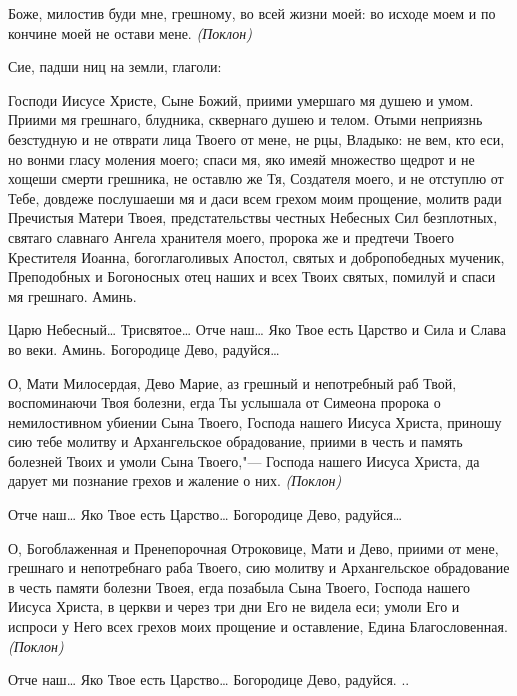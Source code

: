 \normalfont{}Боже, милостив буди мне, грешному, во всей жизни моей: во исходе моем и по кончине моей не остави мене. \itshape (Поклон)

Сие, падши ниц на земли, глаголи:

\normalfont{}Господи Иисусе Христе, Сыне Божий, приими умершаго мя душею и умом. Приими мя грешнаго, блудника, сквернаго душею и телом. Отыми неприязнь безстудную и не отврати лица Твоего от мене, не рцы, Владыко: не вем, кто еси, но вонми гласу моления моего; спаси мя, яко имеяй множество щедрот и не хощеши смерти грешника, не оставлю же Тя, Создателя моего, и не отступлю от Тебе, довдеже послушаеши мя и даси всем грехом моим прощение, молитв ради Пречистыя Матери Твоея, предстательствы честных Небесных Сил безплотных, святаго славнаго Ангела хранителя моего, пророка же и предтечи Твоего Крестителя Иоанна, богоглаголивых Апостол, святых и добропобедных мученик, Преподобных и Богоносных отец наших и всех Твоих святых, помилуй и спаси мя грешнаго. Аминь.

Царю Небесный… Трисвятое… Отче наш… Яко Твое есть Царство и Сила и Слава во веки. Аминь. Богородице Дево, радуйся…






О, Мати Милосердая, Дево Марие, аз грешный и непотребный раб Твой, воспоминаючи Твоя болезни, егда Ты услышала от Симеона пророка о немилостивном убиении Сына Твоего, Господа нашего Иисуса Христа, приношу сию тебе молитву и Архангельское обрадование, приими в честь и память болезней Твоих и умоли Сына Твоего,"--- Господа нашего Иисуса Христа, да дарует ми познание грехов и жаление о них. \itshape (Поклон)\normalfont{}




Отче наш… Яко Твое есть Царство… Богородице Дево, радуйся…

О, Богоблаженная и Пренепорочная Отроковице, Мати и Дево, приими от мене, грешнаго и непотребнаго раба Твоего, сию молитву и Архангельское обрадование в честь памяти болезни Твоея, егда позабыла Сына Твоего, Господа нашего Иисуса Христа, в церкви и через три дни Его не видела еси; умоли Его и испроси у Него всех грехов моих прощение и оставление, Едина Благословенная. \itshape (Поклон)\normalfont{}




Отче наш… Яко Твое есть Царство… Богородице Дево, радуйся. ..

